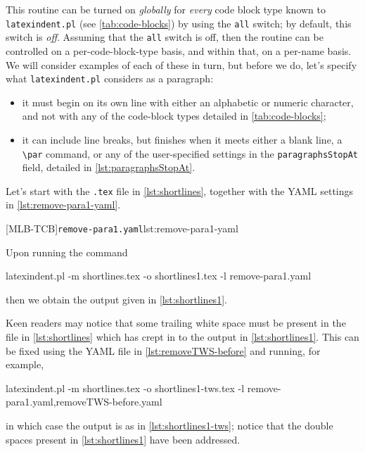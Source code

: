 	This routine can be turned on \emph{globally} for \emph{every} code block type known to \texttt{latexindent.pl} (see \vref{tab:code-blocks}) by using the \texttt{all} switch; by default, this switch is \emph{off}.
	Assuming that the \texttt{all} switch is off, then the routine can be controlled on a per-code-block-type basis, and within that, on a per-name basis.
	We will consider examples of each of these in turn, but before we do, let's specify what \texttt{latexindent.pl} considers as a paragraph: \begin{itemize} \item it must begin on its own line with either an alphabetic or numeric character, and not with any of the code-block types detailed in \vref{tab:code-blocks};
		\item it can include line breaks, but finishes when it meets either a blank line, a \lstinline!\par! command, or any of the user-specified settings in the \texttt{paragraphsStopAt} field, detailed in \vref{lst:paragraphsStopAt}.
	\end{itemize}

	Let's start with the \texttt{.tex} file in \cref{lst:shortlines}, together with the YAML settings in \cref{lst:remove-para1-yaml}.

	\begin{minipage}{.45\linewidth}
	\end{minipage}
	\hfill
	\begin{minipage}{.49\linewidth}
		[MLB-TCB]{\texttt{remove-para1.yaml}}{lst:remove-para1-yaml}
	\end{minipage}

	Upon running the command \begin{commandshell}
latexindent.pl -m shortlines.tex -o shortlines1.tex -l remove-para1.yaml
\end{commandshell} then we obtain the output given in \cref{lst:shortlines1}.


	Keen readers may notice that some trailing white space must be present in the file in \cref{lst:shortlines} which has crept in to the output in \cref{lst:shortlines1}.
	This can be fixed using the YAML file in \vref{lst:removeTWS-before} and running, for example, \begin{commandshell}
latexindent.pl -m shortlines.tex -o shortlines1-tws.tex -l remove-para1.yaml,removeTWS-before.yaml  
    \end{commandshell} in which case the output is as in \cref{lst:shortlines1-tws}; notice that the double spaces present in \cref{lst:shortlines1} have been addressed.

